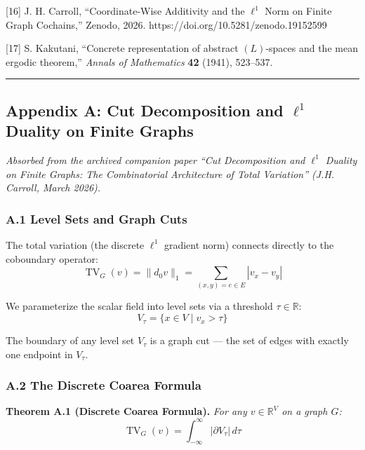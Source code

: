 \documentclass[
]{article}
\begin{document}
{[}16{]} J. H. Carroll, ``Coordinate-Wise Additivity and the \(\ell^1\)
Norm on Finite Graph Cochains,'' Zenodo, 2026.
https://doi.org/10.5281/zenodo.19152599

{[}17{]} S. Kakutani, ``Concrete representation of abstract
\((L)\)-spaces and the mean ergodic theorem,'' \emph{Annals of
Mathematics} \textbf{42} (1941), 523--537.

\begin{center}\rule{0.5\linewidth}{0.5pt}\end{center}

\subsection{\texorpdfstring{Appendix A: Cut Decomposition and \(\ell^1\)
Duality on Finite
Graphs}{Appendix A: Cut Decomposition and \textbackslash ell\^{}1 Duality on Finite Graphs}}\label{appendix-a-cut-decomposition-and-ell1-duality-on-finite-graphs}

\emph{Absorbed from the archived companion paper ``Cut Decomposition and
\(\ell^1\) Duality on Finite Graphs: The Combinatorial Architecture of
Total Variation'' (J.H. Carroll, March 2026).}

\subsubsection{A.1 Level Sets and Graph
Cuts}\label{a.1-level-sets-and-graph-cuts}

The total variation (the discrete \(\ell^1\) gradient norm) connects
directly to the coboundary operator:
\[ \operatorname{TV}_G(v) = \|d_0 v\|_1 = \sum_{(x,y) = e \in E} |v_x - v_y| \]

We parameterize the scalar field into level sets via a threshold
\(\tau \in \mathbb{R}\): \[ V_\tau = \{ x \in V \mid v_x > \tau \} \]

The boundary of any level set \(V_\tau\) is a graph cut --- the set of
edges with exactly one endpoint in \(V_\tau\).

\subsubsection{A.2 The Discrete Coarea
Formula}\label{a.2-the-discrete-coarea-formula}

\textbf{Theorem A.1 (Discrete Coarea Formula).} \emph{For any
\(v \in \mathbb{R}^V\) on a graph \(G\):}
\[ \operatorname{TV}_G(v) = \int_{-\infty}^{\infty} |\partial V_\tau| \, d\tau \]
\end{document}
